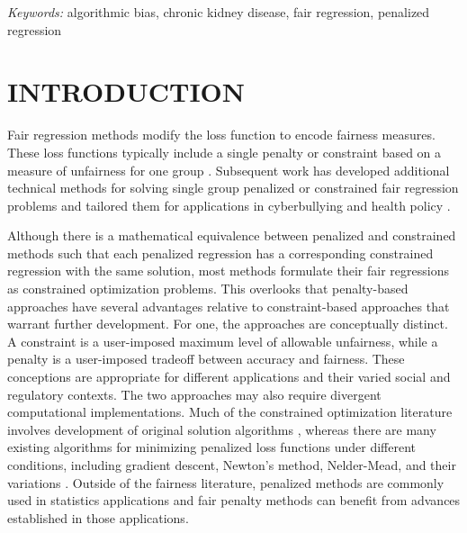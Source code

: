 \documentclass[
  12pt]{article}
\begin{document}
\noindent%
{\it Keywords:} algorithmic bias, chronic kidney disease, fair
regression, penalized regression
\vfill

\newpage
{} %


\section{INTRODUCTION}\label{introduction}

Fair regression methods modify the loss function to encode fairness
measures. These loss functions typically include a single penalty or
constraint based on a measure of unfairness for one group
\citep{calders_controlling_2013, berk_convex_2017, corbett-davies_measure_2023}.
Subsequent work has developed additional technical methods for solving
single group penalized or constrained fair regression problems
\citep{dwork_decoupled_2017, chzhen_fair_2020, lohaus_too_2020, mishler_fade_2021}
and tailored them for applications in cyberbullying
\citep{gencoglu_cyberbullying_2021} and health policy
\citep{zink_fair_2020}.

Although there is a mathematical equivalence between penalized and
constrained methods such that each penalized regression has a
corresponding constrained regression with the same solution, most
methods formulate their fair regressions as constrained optimization
problems. This overlooks that penalty-based approaches have several
advantages relative to constraint-based approaches that warrant further
development. For one, the approaches are conceptually distinct. A
constraint is a user-imposed maximum level of allowable unfairness,
while a penalty is a user-imposed tradeoff between accuracy and
fairness. These conceptions are appropriate for different applications
and their varied social and regulatory contexts. The two approaches may
also require divergent computational implementations. Much of the
constrained optimization literature involves development of original
solution algorithms
\citep{kearns_preventing_2018, komiyama_nonconvex_2018}, whereas there
are many existing algorithms for minimizing penalized loss functions
under different conditions, including gradient descent, Newton's method,
Nelder-Mead, and their variations
\citep{nelder_simplex_1965, shanno_conditioning_1970, loshchilov_decoupled_2019}.
Outside of the fairness literature, penalized methods are commonly used
in statistics applications
\citep{hoerl_ridge_1970, tibshirani_regression_1996} and fair penalty
methods can benefit from advances established in those applications.
\end{document}
